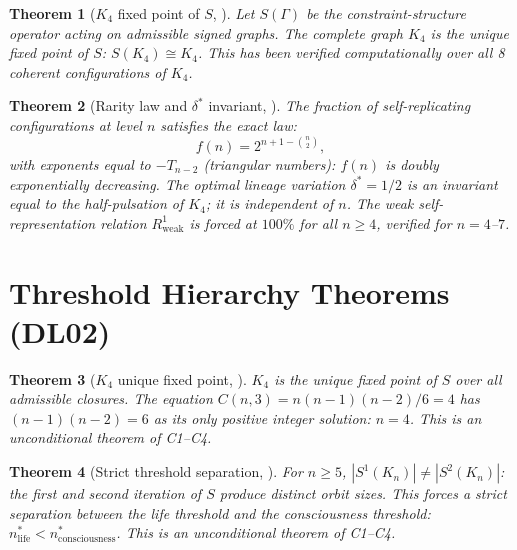 \documentclass[11pt,a4paper]{article}
\theoremstyle{plain}
\newtheorem{theorem}{Theorem}[section]
\theoremstyle{definition}
\theoremstyle{remark}
\begin{document}
\begin{theorem}[$K_4$ fixed point of $S$, \cite{DL01}]
\label{thm:DL01_fixedpoint}
Let $S(\Gamma)$ be the constraint-structure operator acting on admissible signed graphs. The complete graph $K_4$ is the unique fixed point of $S$: $S(K_4) \cong K_4$. This has been verified computationally over all 8 coherent configurations of $K_4$.
\end{theorem}

\begin{theorem}[Rarity law and $\delta^*$ invariant, \cite{DL01}]
\label{thm:DL01_rarity}
The fraction of self-replicating configurations at level $n$ satisfies the exact law:
\begin{equation}
f(n) = 2^{n+1-\binom{n}{2}},
\end{equation}
with exponents equal to $-T_{n-2}$ (triangular numbers): $f(n)$ is doubly exponentially decreasing. The optimal lineage variation $\delta^* = 1/2$ is an invariant equal to the half-pulsation of $K_4$; it is independent of $n$. The weak self-representation relation $R^1_{\mathrm{weak}}$ is forced at $100\%$ for all $n \geq 4$, verified for $n = 4$--$7$.
\end{theorem}

\section{Threshold Hierarchy Theorems (DL02)}
\label{sec:DL02}

\begin{theorem}[$K_4$ unique fixed point, \cite{DL02}]
\label{thm:DL02_unique}
$K_4$ is the unique fixed point of $S$ over all admissible closures. The equation $C(n,3) = n(n-1)(n-2)/6 = 4$ has $(n-1)(n-2) = 6$ as its only positive integer solution: $n = 4$. This is an unconditional theorem of C1--C4.
\end{theorem}

\begin{theorem}[Strict threshold separation, \cite{DL02}]
\label{thm:DL02_separation}
For $n \geq 5$, $|S^1(K_n)| \neq |S^2(K_n)|$: the first and second iteration of $S$ produce distinct orbit sizes. This forces a strict separation between the life threshold and the consciousness threshold: $n^*_{\mathrm{life}} < n^*_{\mathrm{consciousness}}$. This is an unconditional theorem of C1--C4.
\end{theorem}
\end{document}
